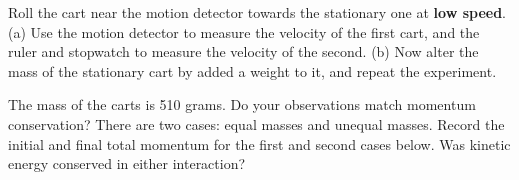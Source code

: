 \documentclass{article}
\begin{document}
Roll the cart near the motion detector towards the stationary one at \textbf{low speed}.  (a) Use the motion detector to measure the velocity of the first cart, and the ruler and stopwatch to measure the velocity of the second.  (b) Now alter the mass of the stationary cart by added a weight to it, and repeat the experiment.  \\ \vspace{1.5cm}

The mass of the carts is 510 grams.  Do your observations match momentum conservation?  There are two cases: equal masses and unequal masses.  Record the initial and final total momentum for the first and second cases below.  Was kinetic energy conserved in either interaction?
\end{document}
